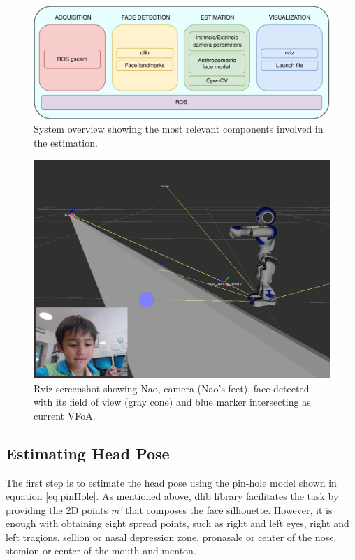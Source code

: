 \documentclass{sig-alternate}
\begin{document}
\begin{figure}[h!]
    \centering
    \includegraphics[width=0.9\columnwidth]{system}
    \caption{\small System overview showing the most relevant components involved in the estimation.}
    \label{system}
\end{figure}


\begin{figure}
    \centering
    \includegraphics[width=0.9\columnwidth]{rviz_camera}
    \caption{\small Rviz screenshot showing Nao, camera (Nao's feet), face detected with its field of view (gray cone) and blue marker intersecting as current VFoA.}
    \label{rviz}
\end{figure}

\subsection{Estimating Head Pose}
The first step is to estimate the head pose using the pin-hole model shown in
equation \ref{eq:pinHole}. As mentioned above, dlib library facilitates the task
by providing the 2D points \textit{m'} that composes the face silhouette.
However, it is enough with obtaining eight spread points, such as right and left
eyes, right and left tragions, sellion or nasal depression zone, pronasale or
center of the nose, stomion or center of the mouth and menton.
\end{document}
